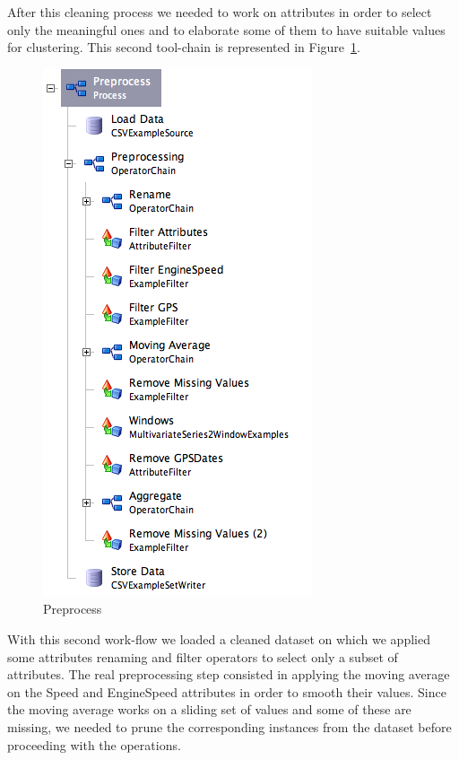 After this cleaning process we needed to work on attributes in order to select only the meaningful ones and to elaborate some of them to have suitable values for clustering. This second tool-chain is represented in Figure~\ref{figure:preprocess}.

\begin{figure}[!]
\centerline{\includegraphics[scale=0.7]{images/preprocess.png}}
\caption{Preprocess}
\label{figure:preprocess}
\end{figure}

With this second work-flow we loaded a cleaned dataset on which we applied some attributes renaming and filter operators to select only a subset of attributes.
The real preprocessing step consisted in applying the moving average on the Speed and EngineSpeed attributes in order to smooth their values. Since the moving average works on a sliding set of values and some of these are missing, we needed to prune the corresponding instances from the dataset before proceeding with the operations.

